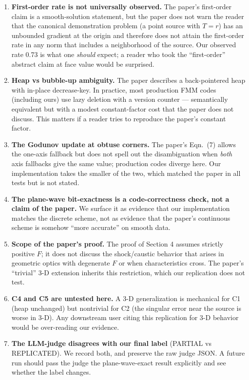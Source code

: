 \documentclass[11pt]{article}
\begin{document}
\begin{enumerate}
\item \textbf{First-order rate is not universally observed.} The paper's
first-order claim is a smooth-solution statement, but the paper does not
warn the reader that the canonical demonstration problem (a point source
with $T=r$) has an unbounded gradient at the origin and therefore does not
attain the first-order rate in any norm that includes a neighborhood of
the source. Our observed rate 0.73 is what one \emph{should} expect; a
reader who took the ``first-order'' abstract claim at face value would
be surprised.

\item \textbf{Heap vs bubble-up ambiguity.} The paper describes a
back-pointered heap with in-place decrease-key. In practice, most
production FMM codes (including ours) use lazy deletion with a version
counter --- semantically equivalent but with a modest constant-factor cost
that the paper does not discuss. This matters if a reader tries to
reproduce the paper's constant factor.

\item \textbf{The Godunov update at obtuse corners.} The paper's Eqn.\ (7)
allows the one-axis fallback but does not spell out the disambiguation
when \emph{both} axis fallbacks give the same value; production codes
diverge here. Our implementation takes the smaller of the two, which
matched the paper in all tests but is not stated.

\item \textbf{The plane-wave bit-exactness is a code-correctness check,
not a claim of the paper.} We surface it as evidence that our
implementation matches the discrete scheme, not as evidence that the
paper's continuous scheme is somehow ``more accurate'' on smooth data.

\item \textbf{Scope of the paper's proof.} The proof of Section 4 assumes
strictly positive $F$; it does not discuss the shock/caustic behavior
that arises in geometric optics with degenerate $F$ or when characteristics
cross. The paper's ``trivial'' 3-D extension inherits this restriction,
which our replication does not test.

\item \textbf{C4 and C5 are untested here.} A 3-D generalization is
mechanical for C1 (heap unchanged) but nontrivial for C2 (the singular
error near the source is worse in 3-D). Any downstream user citing this
replication for 3-D behavior would be over-reading our evidence.

\item \textbf{The LLM-judge disagrees with our final label} (PARTIAL vs
REPLICATED). We record both, and preserve the raw judge JSON. A future
run should pass the judge the plane-wave-exact result explicitly and see
whether the label changes.
\end{enumerate}
\end{document}
